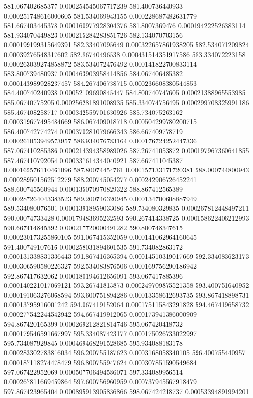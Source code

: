{581.067402685377 0.000254545067717239
581.400736440933 0.000251748616000605
581.534069943155 0.000228687482631779
581.667403445378 0.000160977928304376
581.8007369476 0.000194222526383114
581.934070449823 0.000215284283851726
582.134070703156 0.000199199315649391
582.33407095649 0.000322657861938205
582.534071209824 0.00039276548317602
582.86740496538 0.000431514351917586
583.334072223158 0.000263039274858872
583.534072476492 0.000141822700833114
583.800739480937 0.000463903958414856
584.067406485382 0.000143989928237457
584.267406738715 0.000236608380544853
584.400740240938 0.00052109690845447
584.800740747605 0.00021388965553985
585.06740775205 0.000256281891008935
585.334074756495 0.000299708325991186
585.467408258717 0.000342559701630926
585.734075263162 0.000319677495484669
586.067409018718 0.000504299780200715
586.400742774274 0.000370281079666343
586.667409778719 0.000261053949573957
586.934076783164 0.000176724252447336
587.067410285386 0.000214394358989026
587.26741053872 0.000197967360641855
587.467410792054 0.000337614344040921
587.667411045387 0.000165576110461096
587.80074454761 0.000157133171720381
588.000744800943 0.000289501562512279
588.200745054277 0.000242906726452241
588.600745560944 0.000135070970829322
588.867412565389 0.000287264043383523
589.200746320945 0.000134700608887949
589.534080076501 0.00013918959033086
589.734080329835 0.000267812448497211
590.00074733428 0.000179483695232593
590.267414338725 0.000158622406212993
590.667414845392 0.000217720000491282
590.800748347615 0.000230173255860105
591.067415352059 0.000141062964160645
591.400749107616 0.000258031894601535
591.734082863172 0.000131338831336443
591.867416365394 0.00014510319017669
592.334083623173 0.000306590580226327
592.534083876506 0.000169756290186942
592.867417632062 0.000180194612656091
593.067417885396 0.000140221017069121
593.26741813873 0.000249709875521358
593.400751640952 0.000191063276068594
593.600751894286 0.00013358612693735
593.867418898731 0.00013795916001242
594.067419152064 0.000175115843291828
594.467419658732 0.000277542244542942
594.667419912065 0.000173941386000909
594.867420165399 0.000269212821814746
595.067420418732 0.000179546591667997
595.334087423177 0.000175026733022997
595.734087929845 0.000469468291528685
595.934088183178 0.000283302783816034
596.200755187623 0.0003168058340105
596.400755440957 0.000187118274478479
596.800755947624 0.000307851590549684
597.067422952069 0.000507706494586071
597.334089956514 0.000267811669459864
597.600756960959 0.000737945567918479
597.867423965404 0.000895913905836866
598.067424218737 0.00053394891994201
}
